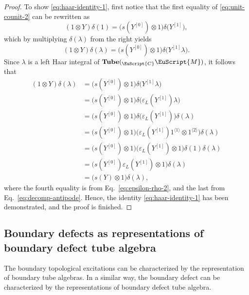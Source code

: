 \documentclass[a4paper,11pt]{article}
\theoremstyle{definition}
\theoremstyle{remark}
\newcommand\eC           {\EuScript{C}}
\newcommand\eM          {\EuScript{M}}
\begin{document}
\begin{proof}
To show \eqref{eq:haar-identity-1}, first notice that the first equality of \eqref{eq:unit-counit-2} can be rewritten as
\begin{equation}
    (1\otimes Y)\delta(1) = \bigl(s(Y^{[0]})\otimes 1\bigr) \delta\bigl(Y^{[1]}\bigr), 
\end{equation}
which by multiplying $\delta(\lambda)$ from the right yields 
\begin{equation}
    (1\otimes Y) \delta(\lambda) = \bigl(s(Y^{[0]})\otimes 1\bigr) \delta\bigl(Y^{[1]}\lambda\bigr). 
\end{equation}
Since $\lambda$ is a left Haar integral of
$\mathbf{Tube}({}_{\eC}\eM)$, it follows that 
\begin{align}
    (1\otimes Y) \delta(\lambda) & = \bigl(s(Y^{[0]})\otimes 1\bigr) \delta\bigl(Y^{[1]}\lambda\bigr) \nonumber \\
    & = \bigl(s(Y^{[0]})\otimes 1\bigr) \delta\bigl(\varepsilon_L(Y^{[1]})\lambda\bigr) \nonumber \\
    & = \bigl(s(Y^{[0]})\otimes 1\bigr) \delta\bigl(\varepsilon_L(Y^{[1]})\bigr)\delta(\lambda) \nonumber \\
    & = \bigl(s(Y^{[0]})\otimes 1\bigr) \bigl(\varepsilon_L(Y^{[1]})1^{\langle 1 \rangle}\otimes 1^{\langle 2 \rangle}\bigr)\delta(\lambda) \nonumber \\
    & = \bigl(s(Y^{[0]})\otimes 1\bigr) \bigl(\varepsilon_L(Y^{[1]})\otimes 1\bigr) \delta(1)\delta(\lambda) \nonumber \\
    & = \bigl(s(Y^{[0]})\varepsilon_L(Y^{[1]})\otimes 1\bigr)  \delta(\lambda) \nonumber \\
    & = \bigl(s(Y)\otimes 1\bigr) \delta(\lambda), 
\end{align}
where the fourth equality is from Eq.~\eqref{eq:epsilon-rho-2}, and the last from Eq.~\eqref{eq:decomp-antipode}. 
Hence, the identity \eqref{eq:haar-identity-1} has been demonstrated, and the proof is finished.
\end{proof}

\subsection{Boundary defects as representations of boundary defect tube algebra}

The boundary topological excitations can be characterized by the representation of boundary tube algebras.
In a similar way, the boundary defect can be characterized by the representations of boundary defect tube algebra.
\end{document}
